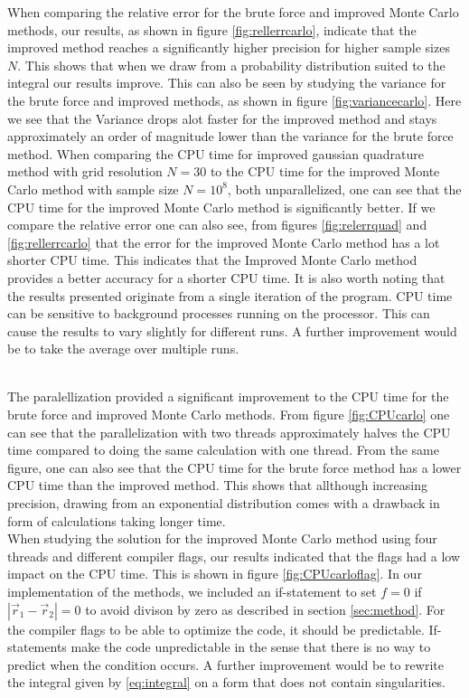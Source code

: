 \documentclass[10pt, twocolumn]{aastex62}
\begin{document}
When comparing the relative error for the brute force and improved Monte Carlo
methods, our results, as shown in figure \ref{fig:rellerrcarlo}, indicate that the improved method reaches a significantly
higher precision for higher sample sizes $N$. This shows that when we draw from
a probability distribution suited to the integral our results improve. This can
also be seen by studying the variance for the brute force and improved methods,
as shown in figure \ref{fig:variancecarlo}. Here we see that the Variance drops
alot faster for the improved method and stays approximately an order of
magnitude lower than the variance for the brute force method. When comparing the
CPU time for improved gaussian quadrature method with grid resolution $N=30$ to
the CPU time for the improved Monte Carlo method with sample size $N=10^8$, both
unparallelized, one can see that the CPU time for the improved Monte Carlo method is significantly
better. If we compare the relative error one can also see, from figures
\ref{fig:relerrquad} and \ref{fig:rellerrcarlo} that the error for the improved
Monte Carlo method has a lot shorter CPU time. This indicates that the Improved
Monte Carlo method provides a better accuracy for a shorter CPU time. It is also
worth noting that the results presented originate from a single iteration of the
program. CPU time can be sensitive to background processes running on the
processor. This can cause the results to vary slightly for different runs.
A further improvement would be to take the average over multiple runs.\\\\\indent

The paralellization provided a significant improvement to the CPU time for the
brute force and improved Monte Carlo methods. From figure \ref{fig:CPUcarlo} one
can see that the parallelization with two threads approximately halves the CPU
time compared to doing the same calculation with one thread. From the same
figure, one can also see that the CPU time for the brute force method has a lower
CPU time than the improved method. This shows that allthough increasing
precision, drawing from an exponential distribution comes with a drawback
in form of calculations taking longer time.\\
When studying the solution for the improved Monte Carlo method using four
threads and different compiler flags, our results indicated that the flags had a
low impact on the CPU time. This is shown in figure \ref{fig:CPUcarloflag}. In
our implementation of the methods, we included an if-statement to set $f=0$ if
$|\vec{r}_1 - \vec{r}_2| = 0$ to avoid divison by zero as described in section
\ref{sec:method}. For the compiler flags to be able to optimize the code, it
should be predictable. If-statements make the code unpredictable in the sense
that there is no way to predict when the condition occurs. A further improvement
would be to rewrite the integral given by \ref{eq:integral} on a form that does
not contain singularities.
\end{document}
